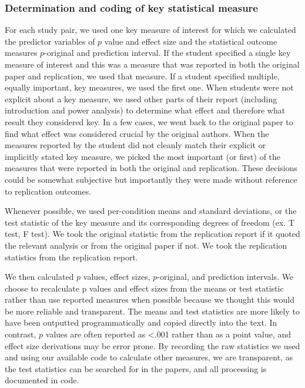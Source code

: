 \documentclass[
  english,
  a4paper,
]{article}
\begin{document}
\hypertarget{determination-and-coding-of-key-statistical-measure}{%
\subsubsection{Determination and coding of key statistical measure}\label{determination-and-coding-of-key-statistical-measure}}

For each study pair, we used one key measure of interest for which we calculated the predictor variables of \(p\) value and effect size and the statistical outcome measures \(p\)-original and prediction interval. If the student specified a single key measure of interest and this was a measure that was reported in both the original paper and replication, we used that measure. If a student specified multiple, equally important, key measures, we used the first one. When students were not explicit about a key measure, we used other parts of their report (including introduction and power analysis) to determine what effect and therefore what result they considered key. In a few cases, we went back to the original paper to find what effect was considered crucial by the original authors. When the measures reported by the student did not cleanly match their explicit or implicitly stated key measure, we picked the most important (or first) of the measures that were reported in both the original and replication. These decisions could be somewhat subjective but importantly they were made without reference to replication outcomes.

Whenever possible, we used per-condition means and standard deviations, or the test statistic of the key measure and its corresponding degrees of freedom (ex. T test, F test). We took the original statistic from the replication report if it quoted the relevant analysis or from the original paper if not. We took the replication statistics from the replication report.

We then calculated \(p\) values, effect sizes, \(p\)-original, and prediction intervals. We choose to recalculate p values and effect sizes from the means or test statistic rather than use reported measures when possible because we thought this would be more reliable and transparent. The means and test statistics are more likely to have been outputted programmatically and copied directly into the text. In contrast, \(p\) values are often reported as \textless.001 rather than as a point value, and effect size derivations may be error prone. By recording the raw statistics we used and using our available code to calculate other measures, we are transparent, as the test statistics can be searched for in the papers, and all processing is documented in code.
\end{document}
